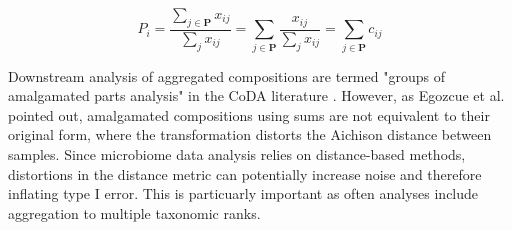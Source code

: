 \documentclass{article}
\begin{document}
 \begin{equation}
P_{i} =\frac{\sum_{j \in \bm{P}} x_{ij}}{\sum_j x_{ij}} = \sum_{j \in \bm{P}} \frac{x_{ij}}{\sum_j x_{ij}} = \sum_{j \in \bm{P}} c_{ij}
\end{equation}

\noindent Downstream analysis of aggregated compositions are termed "groups of amalgamated parts analysis" in the CoDA literature \cite{egozcue2005}. However, as Egozcue et al. \cite{egozcue2005} pointed out, amalgamated compositions using sums are not equivalent to their original form, where the transformation distorts the Aichison distance between samples. Since microbiome data analysis relies on distance-based methods, distortions in the distance metric can potentially increase noise and therefore inflating type I error. This is particuarly important as often analyses include aggregation to multiple taxonomic ranks. \\





\end{document}
